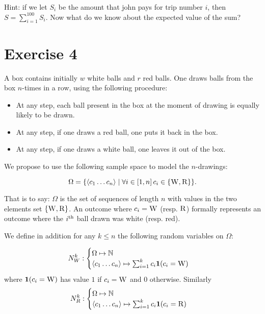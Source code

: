 \documentclass{article}
\begin{document}
Hint: if we let $S_i$ be the amount that john pays for trip number $i$, then $S = \sum^{100}_{i = 1} S_i$. Now what do we know about the expected value of the sum?



\section*{Exercise 4}
A box contains initially $w$ white balls and $r$ red balls. One draws balls from the box $n$-times in a row, using the following procedure:
\begin{itemize}
\item At any step, each ball present in the box at the moment of drawing is equally likely to be drawn.
\item At any step, if one draws a red ball, one puts it back in the box.
\item At any step, if one draws a white ball, one leaves it out of the box.
\end{itemize}

We propose to use the following sample space to model the $n$-drawings:

\[ \Omega = \{ \langle c_1 \dots c_n \rangle \mid \forall i \in [1,n]\, c_i \in \{\textsc{W}, \textsc{R}\} \}. \]

That is to say: $\Omega$ is the set of sequences of length $n$ with values in the two elements set $\{\textsc{W}, \textsc{R}\}$. An outcome where $c_i = \textsc{W}$ (resp. $\textsc{R}$) formally represents an outcome where the $i^{\textnormal{th}}$ ball drawn was white (resp. red). 

We define in addition for any $k \le n$ the following random variables on $\Omega$:

\[N^k_W: \begin{cases} \Omega \mapsto \mathbb{N}\\ \langle c_1 \dots c_n \rangle \mapsto \sum^k_{i = 1} c_i \mathbf{1}(c_i = {\textsc{W}}) \end{cases}\]
where $\mathbf{1}(c_i = \textsc{W})$ has value $1$ if $c_i = \textsc{W}$ and $0$ otherwise. Similarly 
\[N^k_R: \begin{cases} \Omega \mapsto \mathbb{N}\\ \langle c_1 \dots c_n \rangle \mapsto \sum^k_{i = 1} c_i \mathbf{1}(c_i = {\textsc{R}}) \end{cases}\]
\end{document}
